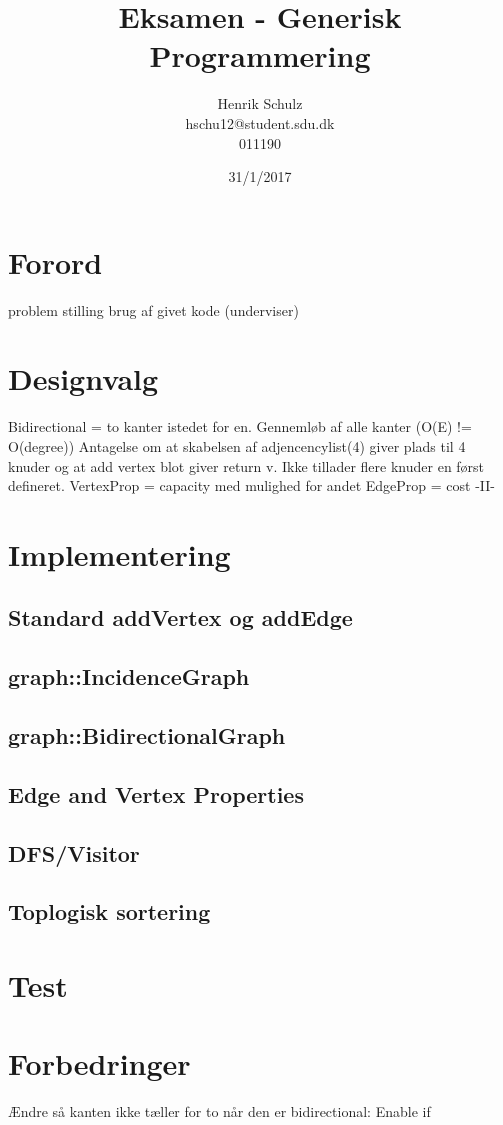 \documentclass[a4paper,10pt,titlepage]{article}
\title{Eksamen - Generisk Programmering}
\author{Henrik Schulz \\ hschu12@student.sdu.dk \\ 011190}
\date{31/1/2017}
\begin{document}
\maketitle

\section{Forord}
problem stilling
brug af givet kode (underviser)
\section{Designvalg}
Bidirectional = to kanter istedet for en.
Gennemløb af alle kanter (O(E) != O(degree))
Antagelse om at skabelsen af adjencencylist(4) giver plads til 4 knuder og at add vertex blot giver return v. Ikke tillader flere knuder en først defineret.
VertexProp = capacity med mulighed for andet
EdgeProp = cost -II-
\section{Implementering}
\subsection{Standard addVertex og addEdge}
\subsection{graph::IncidenceGraph}
\subsection{graph::BidirectionalGraph}
\subsection{Edge and Vertex Properties}
\subsection{DFS/Visitor}
\subsection{Toplogisk sortering}

\section{Test}

\section{Forbedringer}
Ændre så kanten ikke tæller for to når den er bidirectional: Enable if
\end{document}
